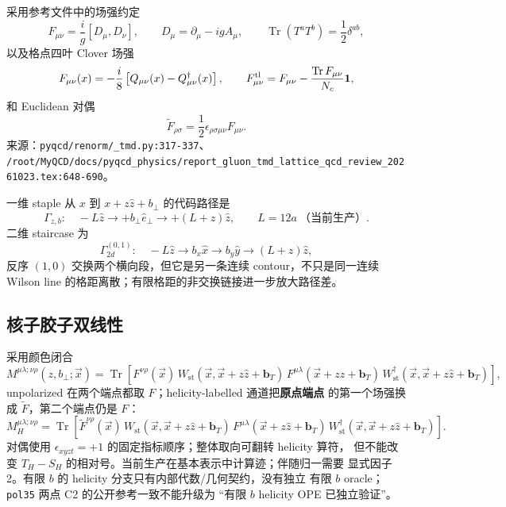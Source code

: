\documentclass[UTF8]{ctexart}
\newcommand{\pathref}[1]{\texttt{\nolinkurl{#1}}}
\newcommand{\Tr}{\operatorname{Tr}}
\newcommand{\bT}{\boldsymbol b_T}
\begin{document}
采用参考文件中的场强约定
\begin{equation}
F_{\mu\nu}=\frac{i}{g}[D_\mu,D_\nu],\qquad
D_\mu=\partial_\mu-igA_\mu,
\qquad
\Tr(T^aT^b)=\frac12\delta^{ab},
\label{eq:field-strength}
\end{equation}
以及格点四叶 Clover 场强
\begin{equation}
F_{\mu\nu}(x)=-\frac{i}{8}\left[Q_{\mu\nu}(x)-Q_{\mu\nu}^{\dagger}(x)\right],
\qquad
F_{\mu\nu}^{\rm tl}=F_{\mu\nu}-\frac{\Tr F_{\mu\nu}}{N_c}\mathbf 1,
\label{eq:clover}
\end{equation}
和 Euclidean 对偶
\begin{equation}
\widetilde F_{\rho\sigma}
=\frac12\epsilon_{\rho\sigma\mu\nu}F_{\mu\nu}.
\label{eq:dual}
\end{equation}
来源：\pathref{pyqcd/renorm/_tmd.py:317-337}、
\pathref{/root/MyQCD/docs/pyqcd_physics/report_gluon_tmd_lattice_qcd_review_20261023.tex:648-690}。

一维 staple 从 \(x\) 到 \(x+z\hat z+b_\perp\) 的代码路径是
\begin{equation}
\Gamma_{z,b}:\quad
-L\hat z\longrightarrow+b_\perp\hat e_\perp
\longrightarrow+(L+z)\hat z,
\qquad L=12a\ \text{（当前生产）}.
\label{eq:staple-path}
\end{equation}
二维 staircase 为
\begin{equation}
\Gamma^{(0,1)}_{2d}:\quad
-L\hat z\to b_x\hat x\to b_y\hat y\to(L+z)\hat z,
\label{eq:staple-2d-01}
\end{equation}
反序 \((1,0)\) 交换两个横向段，但它是另一条连续 contour，不只是同一连续 Wilson line 的格距离散；有限格距的非交换链接进一步放大路径差。

\subsection{核子胶子双线性}

采用颜色闭合
\begin{equation}
M^{\mu\lambda;\nu\rho}(z,b_\perp;\vec x)
=\Tr\!\left[
F^{\nu\rho}(\vec x)\,
W_{\mathrm{st}}(\vec x,\vec x+z\hat z+\bT)\,
F^{\mu\lambda}(\vec x+z\hat z+\bT)\,
W_{\mathrm{st}}^{\dagger}(\vec x,\vec x+z\hat z+\bT)
\right],
\label{eq:tmd-bilocal}
\end{equation}
unpolarized 在两个端点都取 \(F\)；helicity-labelled 通道把\textbf{原点端点}
的第一个场强换成 \(\widetilde F\)，第二个端点仍是 \(F\)：
\begin{equation}
M_H^{\mu\lambda;\nu\rho}
=\Tr\!\left[
\widetilde F^{\nu\rho}(\vec x)\,
W_{\mathrm{st}}(\vec x,\vec x+z\hat z+\bT)\,
F^{\mu\lambda}(\vec x+z\hat z+\bT)\,
W_{\mathrm{st}}^{\dagger}(\vec x,\vec x+z\hat z+\bT)
\right].
\label{eq:helicity-bilocal}
\end{equation}
对偶使用 \(\epsilon_{xyzt}=+1\) 的固定指标顺序；整体取向可翻转 helicity 算符，
但不能改变 \(T_H-S_H\) 的相对号。当前生产在基本表示中计算迹；伴随归一需要
显式因子 2。有限 \(b\) 的 helicity 分支只有内部代数/几何契约，没有独立
有限 \(b\) oracle；\texttt{pol35} 两点 C2 的公开参考一致不能升级为
“有限 \(b\) helicity OPE 已独立验证”。
\end{document}
